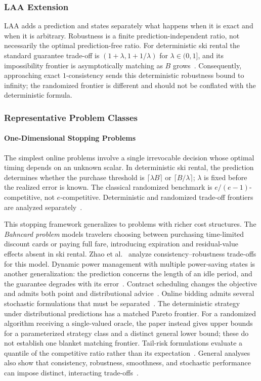 \documentclass[acmsmall,screen,nonacm]{acmart}
\theoremstyle{acmdefinition}%
\begin{document}
\subsubsection{LAA Extension}
LAA adds a prediction and states separately what happens when it is exact and when it is arbitrary. Robustness is a finite prediction-independent ratio, not necessarily the optimal prediction-free ratio. For deterministic ski rental the standard guarantee trade-off is $(1+\lambda,1+1/\lambda)$ for $\lambda\in(0,1]$, and its impossibility frontier is asymptotically matching as $B$ grows~\cite{purohit2018improving,wei2020optimal}. Consequently, approaching exact $1$-consistency sends this deterministic robustness bound to infinity; the randomized frontier is different and should not be conflated with the deterministic formula.

\subsubsection{Representative Problem Classes}

\paragraph{One-Dimensional Stopping Problems}
The simplest online problems involve a single irrevocable decision whose optimal timing depends on an unknown scalar. In deterministic ski rental, the prediction determines whether the purchase threshold is $\lceil\lambda B\rceil$ or $\lceil B/\lambda\rceil$; $\lambda$ is fixed before the realized error is known. The classical randomized benchmark is $e/(e-1)$-competitive, not $e$-competitive. Deterministic and randomized trade-off frontiers are analyzed separately~\cite{purohit2018improving,gollapudi2019rentorbuy,wei2020optimal}.

This stopping framework generalizes to problems with richer cost structures. The \emph{Bahncard problem} models travelers choosing between purchasing time-limited discount cards or paying full fare, introducing expiration and residual-value effects absent in ski rental. Zhao et al.~\cite{zhao2024bahncard} analyze consistency--robustness trade-offs for this model. Dynamic power management with multiple power-saving states is another generalization: the prediction concerns the length of an idle period, and the guarantee degrades with its error~\cite{antoniadis2021power}. Contract scheduling changes the objective and admits both point and distributional advice~\cite{angelopoulos2023contract,angelopoulos2024distributional}. Online bidding admits several stochastic formulations that must be separated~\cite{angelopoulos2025bidding}. The deterministic strategy under distributional predictions has a matched Pareto frontier. For a randomized algorithm receiving a single-valued oracle, the paper instead gives upper bounds for a parameterized strategy class and a distinct general lower bound; these do not establish one blanket matching frontier. Tail-risk formulations evaluate a quantile of the competitive ratio rather than its expectation~\cite{dinitz2024tailrisk}. General analyses also show that consistency, robustness, smoothness, and stochastic performance can impose distinct, interacting trade-offs~\cite{benomar2025tradeoffs}.
\end{document}

